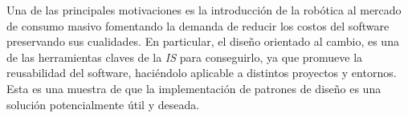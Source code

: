  Una de las principales motivaciones es la introducción de la robótica al mercado de consumo masivo fomentando la demanda de reducir los costos del software preservando sus cualidades. En particular, el diseño orientado al cambio, es una de las herramientas claves de la \textit{IS} para conseguirlo, ya que promueve la reusabilidad del software, haciéndolo aplicable a distintos proyectos y entornos. Esta es una muestra de que la implementación de patrones de diseño es una solución potencialmente útil y deseada.

